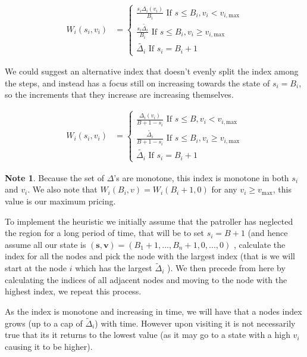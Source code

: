 \documentclass[a4paper,10pt]{article}
\theoremstyle{definition}
\theoremstyle{definition}
\theoremstyle{remark}
\theoremstyle{definition}
\newtheorem*{note}{Note}
\begin{document}
\begin{align}
W_{i}(s_{i},v_{i})&=\begin{cases}
\frac{s_{i} \Delta_{i}(v_{i})}{B_{i}} \text{ If } s \leq B_{i},v_{i}<v_{i,\text{max}} \\
\frac{s_{i} \widetilde{\Delta_{i}}}{B_{i}} \text{ If } s \leq B_{i},v_{i} \geq v_{i,\text{max}} \\
\widetilde{\Delta_{i}} \text{ If } s_{i}=B_{i}+1
\end{cases}
\end{align}

We could suggest an alternative index that doesn't evenly split the index among the steps, and instead has a focus still on increasing towards the state of $s_{i}=B_{i}$, so the increments that they increase are increasing themselves.

\begin{align}
W_{i}(s_{i},v_{i})&=\begin{cases}
\frac{\Delta_{i}(v_{i})}{B+1-s_{i}} \text{ If } s \leq B,v_{i}<v_{i,\text{max}} \\
\frac{\widetilde{\Delta_{i}}}{B+1-s_{i}} \text{ If } s \leq B_{i},v_{i} \geq v_{i,\text{max}} \\
\widetilde{\Delta_{i}} \text{ If } s_{i}=B_{i}+1
\end{cases}
\end{align}



\begin{note}
Because the set of $\Delta$'s are monotone, this index is monotone in both $s_{i}$ and $v_{i}$. We also note that $W_{i}(B_{i},v)=W_{i}(B_{i}+1,0)$ for any $v_{i} \geq v_{\text{max}}$, this value is our maximum pricing.
\end{note}

To implement the heuristic we initially assume that the patroller has neglected the region for a long period of time, that will be to set $s_{i}=B+1$ (and hence assume all our state is $(\bm{s},\bm{v})=(B_{1}+1,...,B_{n}+1,0,...,0)$ , calculate the index for all the nodes and pick the node with the largest index (that is we will start at the node $i$ which has the largest $\widetilde{\Delta}_{i}$ ).
We then precede from here by calculating the indices of all adjacent nodes and moving to the node with the highest index, we repeat this process.

As the index is monotone and increasing in time, we will have that a nodes index grows (up to a cap of $\widetilde{\Delta}_{i}$) with time. However upon visiting it is not necessarily true that its it returns to the lowest value (as it may go to a state with a high $v_{i}$ causing it to be higher).
\end{document}
